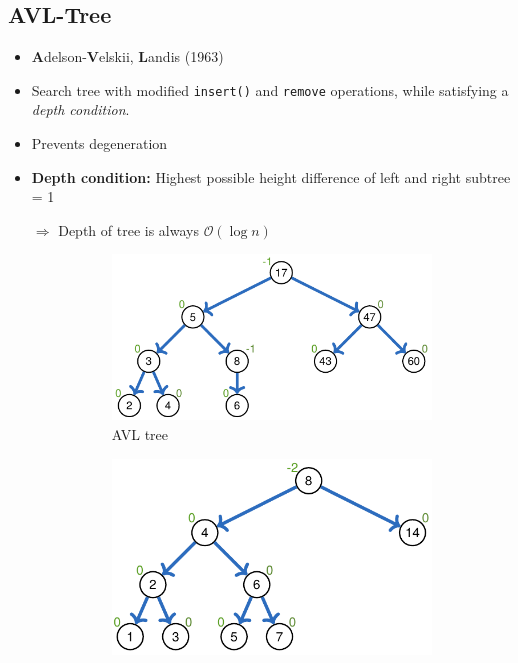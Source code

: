 \documentclass[12pt, a4paper]{scrartcl}
\newcommand{\bigO}{\mathcal{O}}
\renewcommand{\implies}{\Rightarrow}
\begin{document}
\subsection{AVL-Tree}
\label{sec:avl-tree}
\begin{itemize}
\item \textbf{A}delson-\textbf{V}elskii, \textbf{L}andis (1963)
\item Search tree with modified \texttt{insert()} and \texttt{remove} operations, while satisfying a \emph{depth condition}.
\item Prevents degeneration
\item \textbf{Depth condition:} Highest possible height difference of left and right subtree = 1
\item[$\implies$] Depth of tree is always $\bigO(\log n)$
\begin{figure}[htbp]
  \centering
  \begin{subfigure}[b]{.3\textwidth}
    \includegraphics[width=\textwidth]{avl_tree}
    \caption{AVL tree}
  \end{subfigure}
  \begin{subfigure}[b]{0.25\textwidth}
    \includegraphics[width=\textwidth]{avl_tree_bad}

\end{subfigure}
\end{figure}
\end{itemize}
\end{document}
